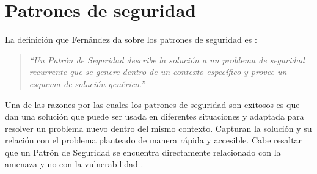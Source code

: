 %





\section{Patrones de seguridad}\label{sec:patSeg}

La definición que Fernández da sobre los patrones de seguridad es \cite{SchFerHyb06}:

\begin{quote}
\textit{``Un Patrón de Seguridad describe la solución a un problema de seguridad recurrente que se genere dentro de un contexto específico y provee un esquema de solución genérico.''}
\end{quote}

Una de las razones por las cuales los patrones de seguridad son exitosos es que dan una solución que puede ser usada en diferentes situaciones y adaptada para resolver un problema nuevo dentro del mismo contexto. Capturan la solución y su relación con el problema planteado de manera rápida y accesible. Cabe resaltar que un Patrón de Seguridad se encuentra directamente relacionado con la amenaza y no con la vulnerabilidad \cite{SchFerHyb06}. 

